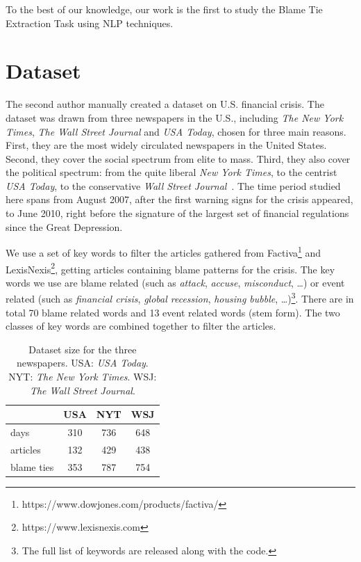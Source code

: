 \documentclass[letterpaper]{article}
\begin{document}
To the best of our knowledge, our work is the first to study the Blame Tie Extraction Task using NLP techniques.

\section{Dataset}
\label{dataset}
The second author manually created a dataset on U.S. financial crisis. The dataset was drawn from three newspapers in the U.S., including {\it The New York Times}, {\it The Wall Street Journal} and {\it USA Today}, chosen for three main reasons. First, they are the most widely circulated newspapers in the United States. Second, they cover the social spectrum from elite to mass. Third, they also cover the political spectrum: from the quite liberal {\it New York Times}, to the centrist {\it USA Today}, to the conservative {\it Wall Street Journal}~\cite{gentzkow2010drives,groseclose2005measure}. The time period studied here spans from August 2007, after the first warning signs for the crisis appeared, to June 2010, right before the signature of the largest set of financial regulations since the Great Depression.

We use a set of key words to filter the articles gathered from Factiva\footnote{https://www.dowjones.com/products/factiva/} and LexisNexis\footnote{https://www.lexisnexis.com}, getting articles containing blame patterns for the crisis. The key words we use are blame related (such as {\it attack}, {\it accuse}, {\it misconduct}, \ldots) or event related (such as {\it financial crisis}, {\it global recession}, {\it housing bubble}, \ldots)\footnote{The full list of keywords are released along with the code.}. There are in total 70 blame related words and 13 event related words (stem form). The two classes of key words are combined together to filter the articles.

\begin{table}[t!]
\centering
\begin{tabular}{l c c c} 
 \hline
 & {\bf USA} &  {\bf NYT}  & {\bf WSJ} \\ 
 \hline\hline
 days & 310 & 736 & 648 \\ 
 articles & 132 & 429 & 438 \\
 blame ties & 353 & 787 & 754 \\
 \hline
\end{tabular}
\caption{Dataset size for the three newspapers. USA: {\it USA Today}. NYT: {\it The New York Times}. WSJ: {\it The Wall Street Journal}.}
\label{table:dataset}
\end{table}
\end{document}
